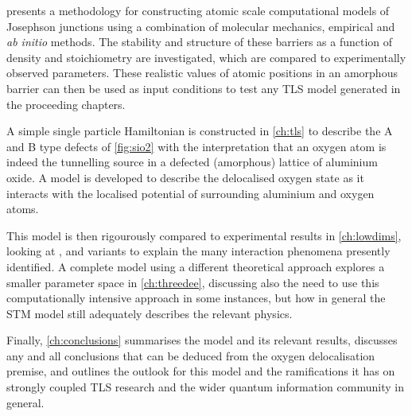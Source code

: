  presents a methodology for constructing atomic scale computational models of Josephson junctions using a combination of molecular mechanics, empirical and \textit{ab initio} methods.
The stability and structure of these barriers as a function of density and stoichiometry are investigated, which are compared to experimentally observed parameters.
These realistic values of atomic positions in an amorphous barrier can then be used as input conditions to test any TLS model generated in the proceeding chapters.

A simple single particle Hamiltonian is constructed in \cref{ch:tls} to describe the A and B type defects of \cref{fig:sio2} with the interpretation that an oxygen atom is indeed the tunnelling source in a defected (amorphous) lattice of aluminium oxide.
A model is developed to describe the delocalised oxygen state as it interacts with the localised potential of surrounding aluminium and oxygen atoms.

This model is then rigourously compared to experimental results in \cref{ch:lowdims}, looking at ,  and  variants to explain the many interaction phenomena presently identified.
A complete  model using a different theoretical approach explores a smaller parameter space in \cref{ch:threedee}, discussing also the need to use this computationally intensive approach in some instances, but how in general the  STM model still adequately describes the relevant physics.

Finally, \cref{ch:conclusions} summarises the model and its relevant results, discusses any and all conclusions that can be deduced from the oxygen delocalisation premise, and outlines the outlook for this model and the ramifications it has on strongly coupled TLS research and the wider quantum information community in general.



